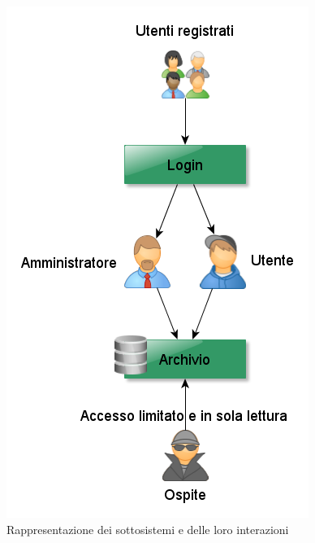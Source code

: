 \begin{figure}
\centering
\includegraphics[scale=0.8]{sottosistemi.png}
\caption{\label{sottosistemi} Rappresentazione dei sottosistemi e delle loro interazioni}
\end{figure}

\pagebreak
